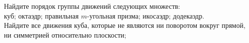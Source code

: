 \documentclass[a4paper,11pt]{article}
\begin{document}
Найдите порядок группы движений следующих множеств:\\
куб;
октаэдр;
правильная $m$-угольная призма;
икосаэдр;
додекаэдр.
\\
Найдите все движения куба, которые не являются ни поворотом вокруг прямой, ни симметрией относительно плоскости;
\noindent{}


{}
\end{document}

